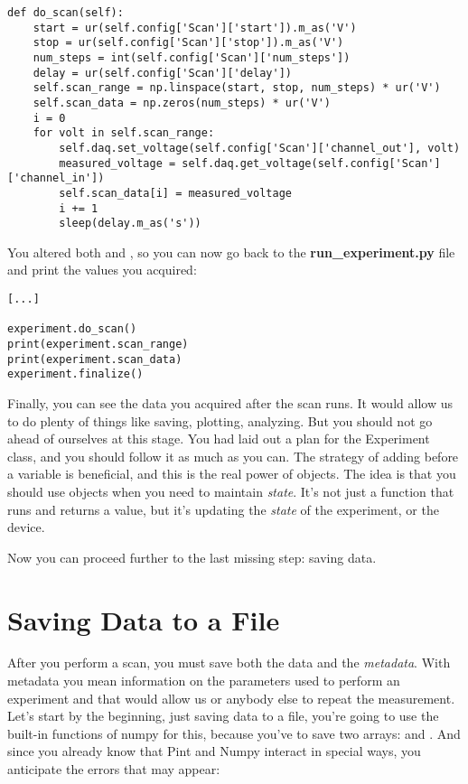 \begin{verbatim}
def do_scan(self):
    start = ur(self.config['Scan']['start']).m_as('V')
    stop = ur(self.config['Scan']['stop']).m_as('V')
    num_steps = int(self.config['Scan']['num_steps'])
    delay = ur(self.config['Scan']['delay'])
    self.scan_range = np.linspace(start, stop, num_steps) * ur('V')
    self.scan_data = np.zeros(num_steps) * ur('V')
    i = 0
    for volt in self.scan_range:
        self.daq.set_voltage(self.config['Scan']['channel_out'], volt)
        measured_voltage = self.daq.get_voltage(self.config['Scan']['channel_in'])
        self.scan_data[i] = measured_voltage
        i += 1
        sleep(delay.m_as('s'))
\end{verbatim}

You altered both  and , so you can now go back to the \textbf{run\_experiment.py} file and print the values you acquired:

\begin{verbatim}
[...]

experiment.do_scan()
print(experiment.scan_range)
print(experiment.scan_data)
experiment.finalize()
\end{verbatim}

Finally, you can see the data you acquired after the scan runs. It would allow us to do plenty of things like saving, plotting, analyzing. But you should not go ahead of ourselves at this stage. You had laid out a plan for the Experiment class, and you should follow it as much as you can. The strategy of adding  before a variable is beneficial, and this is the real power of objects. The idea is that you should use objects when you need to maintain \emph{state}. It's not just a function that runs and returns a value, but it's updating the \emph{state} of the experiment, or the device.

Now you can proceed further to the last missing step: saving data.

\section{Saving Data to a File}\label{sec:saving-data}
After you perform a scan, you must save both the data and the \emph{metadata}. With metadata you mean information on the parameters used to perform an experiment and that would allow us or anybody else to repeat the measurement. Let's start by the beginning, just saving data to a file, you're going to use the built-in functions of numpy for this, because you've to save two arrays:  and . And since you already know that Pint and Numpy interact in special ways, you anticipate the errors that may appear:

